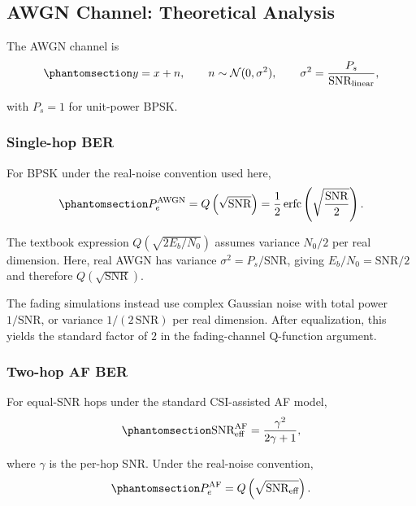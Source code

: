 \subsection{AWGN Channel: Theoretical Analysis}\label{sec:awgn-channel-theoretical-analysis}

The AWGN channel is
\begin{equation}\protect\phantomsection\label{eq:awgn-channel}
y=x+n,
\qquad
n\sim\mathcal{N}(0,\sigma^2),
\qquad
\sigma^2=\frac{P_s}{\text{SNR}_{\text{linear}}},
\end{equation}
with \(P_s=1\) for unit-power BPSK.

\subsubsection{Single-hop BER}\label{sec:awgn-single-hop-ber}

For BPSK under the real-noise convention used here,
\begin{equation}\protect\phantomsection\label{eq:awgn-ber}
P_e^{\text{AWGN}}
=
Q\left(\sqrt{\text{SNR}}\right)
=
\frac{1}{2}
\operatorname{erfc}
\left(
\sqrt{\frac{\text{SNR}}{2}}
\right).
\end{equation}

\begin{remark}\label{noise-convension}
The textbook expression \(Q(\sqrt{2E_b/N_0})\) assumes variance \(N_0/2\) per real dimension. Here, real AWGN has variance \(\sigma^2=P_s/\text{SNR}\), giving \(E_b/N_0=\text{SNR}/2\) and therefore \(Q(\sqrt{\text{SNR}})\).

The fading simulations instead use complex Gaussian noise with total power \(1/\text{SNR}\), or variance \(1/(2\,\text{SNR})\) per real dimension. After equalization, this yields the standard factor of \(2\) in the fading-channel Q-function argument.
\end{remark}

\subsubsection{Two-hop AF BER}\label{sec:awgn-two-hop-af-ber}

For equal-SNR hops under the standard CSI-assisted AF model,
\begin{equation}\protect\phantomsection\label{eq:af-snr-eff}
\text{SNR}_{\text{eff}}^{\text{AF}}
=
\frac{\gamma^2}{2\gamma+1},
\end{equation}
where \(\gamma\) is the per-hop SNR. Under the real-noise convention,
\begin{equation}\protect\phantomsection\label{eq:af-p-eff}
P_e^{\text{AF}}
=
Q\left(\sqrt{\text{SNR}_{\text{eff}}}\right).
\end{equation}

